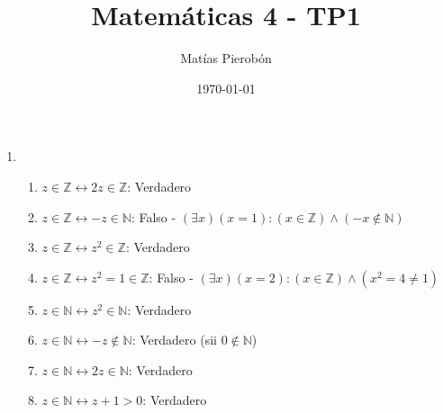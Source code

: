 \documentclass[11pt]{article}
\title{Matemáticas 4 - TP1}
\author{Matías Pierobón}
\date{\today}
\begin{document}
\maketitle

\begin{enumerate}
\item 
\begin{enumerate}
	\item $z \in \mathbb{Z} \leftrightarrow 2 z \in \mathbb{Z}$: Verdadero
	\item $z \in \mathbb{Z} \leftrightarrow -z \in \mathbb{N}$: Falso - $\left(\exists x\right) \left(x = 1\right) : \left(x \in \mathbb{Z}\right) \land \left(-x \notin \mathbb{N}\right)$
	\item $z \in \mathbb{Z} \leftrightarrow z^2 \in \mathbb{Z}$: Verdadero
	\item $z \in \mathbb{Z} \leftrightarrow z^2 = 1 \in \mathbb{Z}$: Falso - $\left(\exists x\right) \left(x = 2\right) : \left(x \in \mathbb{Z}\right) \land \left(x^2 = 4 \neq 1\right)$
	\item $z \in \mathbb{N} \leftrightarrow z^2 \in \mathbb{N}$: Verdadero
	\item $z \in \mathbb{N} \leftrightarrow -z \notin \mathbb{N}$: Verdadero (sii $0 \notin \mathbb{N}$)
	\item $z \in \mathbb{N} \leftrightarrow 2z \in \mathbb{N}$: Verdadero
	\item $z \in \mathbb{N} \leftrightarrow z + 1 > 0$: Verdadero
\end{enumerate}
\end{enumerate}
\end{document}
